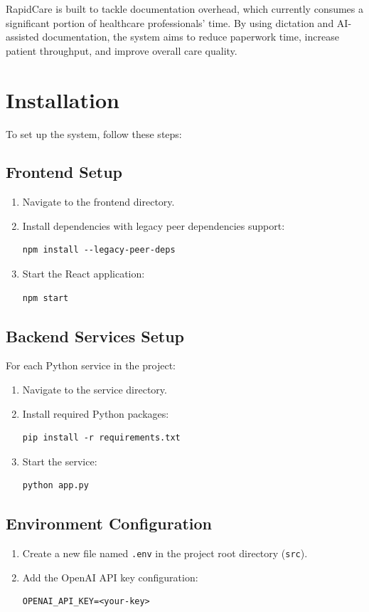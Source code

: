 \documentclass[12pt, titlepage]{article}
\begin{document}
RapidCare is built to tackle documentation overhead, which currently consumes a significant portion of healthcare professionals' time. By using dictation and AI-assisted documentation, the system aims to reduce paperwork time, increase patient throughput, and improve overall care quality.

\newpage

\section{Installation}
To set up the system, follow these steps:
\subsection{Frontend Setup}
\begin{enumerate}
\item Navigate to the frontend directory.
\item Install dependencies with legacy peer dependencies support:
\begin{verbatim}
npm install --legacy-peer-deps
\end{verbatim}
\item Start the React application:
\begin{verbatim}
npm start
\end{verbatim}
\end{enumerate}
\subsection{Backend Services Setup}
For each Python service in the project:
\begin{enumerate}
\item Navigate to the service directory.
\item Install required Python packages:
\begin{verbatim}
pip install -r requirements.txt
\end{verbatim}
\item Start the service:
\begin{verbatim}
python app.py
\end{verbatim}
\end{enumerate}
\subsection{Environment Configuration}
\begin{enumerate}
\item Create a new file named \texttt{.env} in the project root directory (\texttt{src}).
\item Add the OpenAI API key configuration:
\begin{verbatim}
OPENAI_API_KEY=<your-key>
\end{verbatim}
\end{enumerate}
\end{document}
